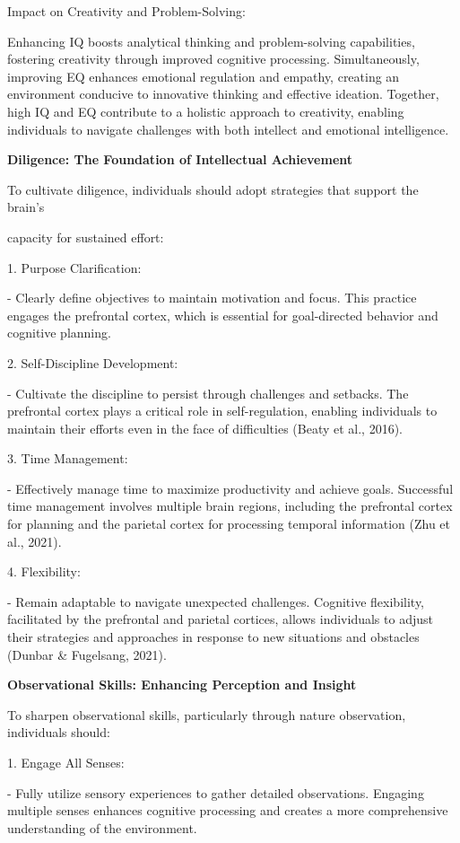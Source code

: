 \documentclass[
]{article}
\begin{document}
Impact on Creativity and Problem-Solving:

Enhancing IQ boosts analytical thinking and problem-solving
capabilities, fostering creativity through improved cognitive
processing. Simultaneously, improving EQ enhances emotional regulation
and empathy, creating an environment conducive to innovative thinking
and effective ideation. Together, high IQ and EQ contribute to a
holistic approach to creativity, enabling individuals to navigate
challenges with both intellect and emotional intelligence.

\textbf{Diligence: The Foundation of Intellectual Achievement}

To cultivate diligence, individuals should adopt strategies that support
the brain's

capacity for sustained effort:

1. Purpose Clarification:

- Clearly define objectives to maintain motivation and focus. This
practice engages the prefrontal cortex, which is essential for
goal-directed behavior and cognitive planning.

2. Self-Discipline Development:

- Cultivate the discipline to persist through challenges and setbacks.
The prefrontal cortex plays a critical role in self-regulation, enabling
individuals to maintain their efforts even in the face of difficulties
(Beaty et al., 2016).

3. Time Management:

- Effectively manage time to maximize productivity and achieve goals.
Successful time management involves multiple brain regions, including
the prefrontal cortex for planning and the parietal cortex for
processing temporal information (Zhu et al., 2021).

4. Flexibility:

- Remain adaptable to navigate unexpected challenges. Cognitive
flexibility, facilitated by the prefrontal and parietal cortices, allows
individuals to adjust their strategies and approaches in response to new
situations and obstacles (Dunbar \& Fugelsang, 2021).

\textbf{Observational Skills: Enhancing Perception and Insight}

To sharpen observational skills, particularly through nature
observation, individuals should:

1. Engage All Senses:

- Fully utilize sensory experiences to gather detailed observations.
Engaging multiple senses enhances cognitive processing and creates a
more comprehensive\\
understanding of the environment.
\end{document}

